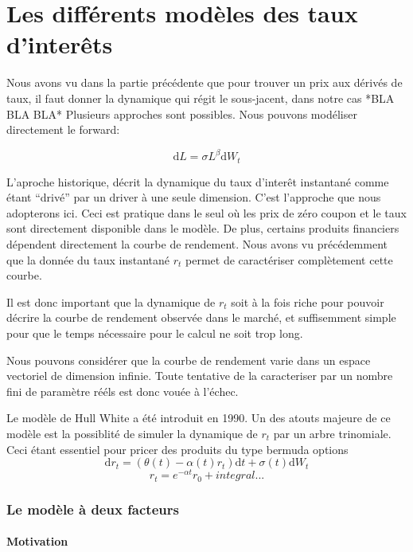 
\chapter{Les différents modèles des taux d'interêts}

Nous avons vu dans la partie précédente que pour trouver un prix aux dérivés de taux, il faut donner la dynamique qui régit le sous-jacent, dans notre cas  *BLA BLA BLA*
Plusieurs approches sont possibles. Nous pouvons modéliser directement le forward:

$$\mathrm{d} L = \sigma L^\beta \mathrm{d}W_t$$

L'aproche historique, décrit la dynamique du taux d'interêt instantané comme étant ``drivé'' par un driver à une seule dimension. C'est l'approche que nous adopterons ici.
Ceci est pratique dans le seul où les prix de zéro coupon et le taux sont directement disponible dans le modèle.
De plus, certains produits financiers dépendent directement la courbe de rendement.
Nous avons vu précédemment que la donnée du taux instantané $r_t$ permet de caractériser complètement cette courbe. 

Il est donc important que la dynamique de $r_t$ soit à la fois riche pour pouvoir décrire la courbe de rendement observée dans le marché, et suffisemment simple pour que le temps nécessaire pour le calcul ne soit trop long.

Nous pouvons considérer que la courbe de rendement varie dans un espace vectoriel de dimension infinie. Toute tentative de la caracteriser par un nombre fini de paramètre rééls est donc vouée à l'échec.

Le modèle de Hull White a été introduit en 1990.  Un des atouts majeure de ce modèle est la possiblité de simuler la dynamique de $r_t$ par un arbre trinomiale. Ceci étant essentiel pour pricer des produits du type bermuda options
$$ \mathrm{d}r_t =  (\theta(t) - \alpha(t) r_t) \mathrm{d}t + \sigma(t) \mathrm{d} W_t$$
$$ r_t = e^{-\alpha t} r_0 + integral ...$$


\newpage
\subsection{Le modèle à deux facteurs}
\subsubsection{Motivation}


